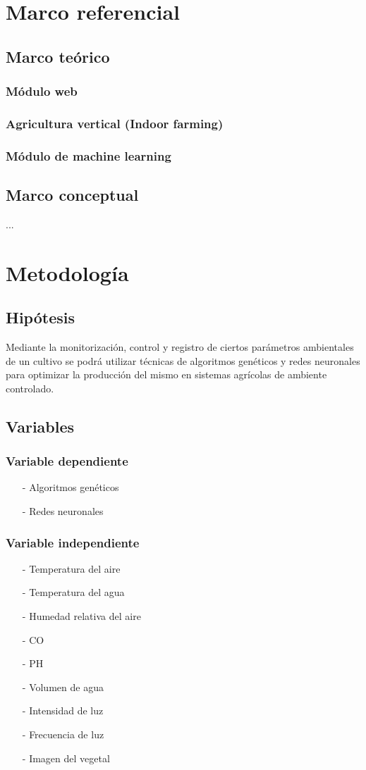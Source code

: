 \documentclass{report}
\begin{document}
\chapter{Marco referencial}
\section{Marco teórico}
\subsection{Módulo web}
\subsection{Agricultura vertical (Indoor farming)}
\subsection{Módulo de machine learning}
\section{Marco conceptual}
...
\chapter{Metodología}
\section{Hipótesis}
Mediante la monitorización, control y registro de ciertos parámetros ambientales de
un cultivo se podrá utilizar técnicas de algoritmos genéticos y redes neuronales
para optimizar la producción del mismo en sistemas agrícolas de ambiente controlado.
\section{Variables}
\subsection{Variable dependiente}
\begin{enumerate}
\item[-] Algoritmos genéticos
\item[-] Redes neuronales
\end{enumerate}
\subsection{Variable independiente}
\begin{enumerate}
\item[-] Temperatura del aire
\item[-] Temperatura del agua
\item[-] Humedad relativa del aire
\item[-] CO
\item[-] PH
\item[-] Volumen de agua
\item[-] Intensidad de luz
\item[-] Frecuencia de luz
\item[-] Imagen del vegetal
\end{enumerate}
\end{document}
